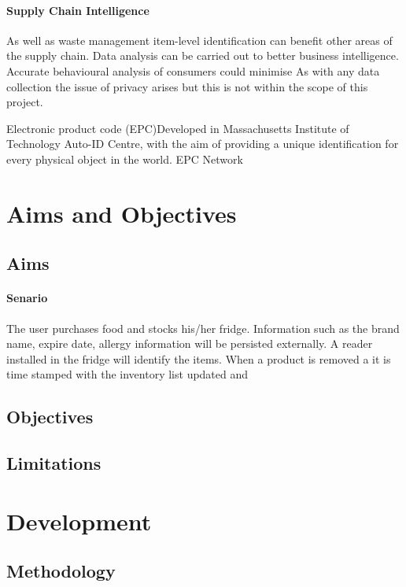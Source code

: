 \documentclass[a4paper, 11pt]{article}
\begin{document}
\paragraph{Supply Chain Intelligence} As well as waste management item-level identification can benefit other areas of the supply chain. Data analysis can be carried out to better business intelligence. Accurate behavioural analysis of consumers could minimise 
As with any data collection the issue of privacy arises but this is not within the scope of this project. 

Electronic product code (EPC)Developed in Massachusetts Institute of Technology Auto-ID Centre, with the aim of providing a unique identification for every physical object in the world. EPC Network

\clearpage
\section{Aims and Objectives}
\subsection{Aims}

\paragraph{Senario}The user purchases food and stocks his/her fridge. Information such as the brand name, expire date, allergy information will be persisted externally. A reader installed in the fridge will identify the items. When a product is removed a it is time stamped with the inventory list updated and 

\subsection{Objectives}
\subsection{Limitations}
\clearpage


\section{Development}
\subsection{Methodology}
\end{document}
